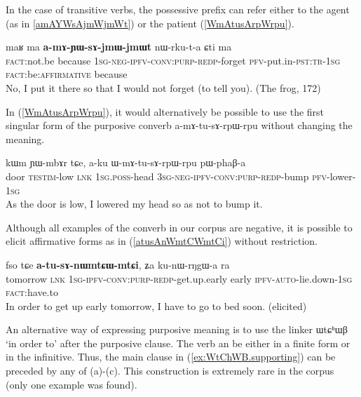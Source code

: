 \documentclass[oldfontcommands,oneside,a4paper,11pt]{article}
\newcommand{\ipa}[1]{{\phon \mbox{#1}}} %
\newcommand{\refb}[1]{(\ref{#1})}
\begin{document}
In the case of transitive verbs, the possessive prefix can refer either to the agent (as in \ref{amAYWsAjmWjmWt}) or the patient \refb{WmAtusArpWrpu}.

\begin{exe}
\ex \label{amAYWsAjmWjmWt}
\gll 
\ipa{maʁ}   	\ipa{ma}   	\ipa{\textbf{a-mɤ-ɲɯ-sɤ-jmɯ-jmɯt}}   	\ipa{nɯ-rku-t-a}   	\ipa{ɕti}   	\ipa{ma}   \\
\textsc{fact}:not.be because \textsc{1sg-neg-ipfv-conv:purp-redp}-forget \textsc{pfv}-put.in-\textsc{pst:tr-1sg} \textsc{fact}:be:\textsc{affirmative} because \\
\glt No, I put it there so that I would not forget (to tell you). (The frog, 172)
\end{exe}

In \refb{WmAtusArpWrpu}, it would alternatively be possible to use the first singular form of the purposive converb \ipa{a-mɤ-tu-sɤ-rpɯ-rpu}   without changing the meaning.

 \begin{exe}
\ex \label{WmAtusArpWrpu}
\gll 
\ipa{kɯm}    	\ipa{ɲɯ-mbɤr}    	\ipa{tɕe,}    	\ipa{a-ku}    	\ipa{ɯ-mɤ-tu-sɤ-rpɯ-rpu}    	\ipa{pɯ-phaβ-a}    \\
door \textsc{testim}-low \textsc{lnk} \textsc{1sg.poss}-head \textsc{3sg-neg-ipfv-conv:purp-redp}-bump \textsc{pfv}-lower-\textsc{1sg}\\
\glt As the door is low, I lowered my head so as not to bump it.
\end{exe}

Although all examples of the converb in our corpus are negative, it is possible to elicit affirmative forms  as in \refb{atusAnWmtCWmtCi} without restriction.

\begin{exe}
\ex \label{atusAnWmtCWmtCi}
\gll
 \ipa{fso}   	\ipa{tɕe}   	\ipa{\textbf{a-tu-sɤ-nɯmtɕɯ-mtɕi},}   	\ipa{ʑa}   	\ipa{ku-nɯ-rŋgɯ-a}   	\ipa{ra}  \\
tomorrow \textsc{lnk} \textsc{1sg-ipfv-conv:purp-redp}-get.up.early early \textsc{ipfv-auto}-lie.down-\textsc{1sg} \textsc{fact}:have.to 
\\
\glt In order to get up early tomorrow, I have to go to bed soon. (elicited) 
\end{exe}

 An alternative way of expressing purposive meaning is to use the linker \ipa{ɯtɕʰɯβ} `in order to'  after the purposive clause. The verb  an be either in a finite form or in the infinitive.  Thus, the main clause in \refb{ex:WtChWB.supporting}  can be preceded by any of  (a)-(c).  This construction is extremely rare in the corpus (only one example was found).
 
\end{document}
